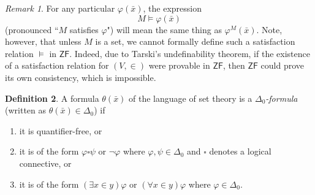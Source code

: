 \documentclass[10pt,letterpaper,cm]{nupset}
\theoremstyle{definition}
\newtheorem{definition}{Definition}[subsection]
\theoremstyle{theorem}
\theoremstyle{remark}
\newtheorem{remark}[definition]{Remark}
\newcommand{\1}{\mathbf{1}}
\newcommand{\0}{\vec 0}
\newcommand{\zf}{\mathsf{ZF}}
\newcommand{\be}{\begin{enumerate}}
\newcommand{\ee}{\end{enumerate}}
\begin{document}
\begin{remark}
For any particular $\varphi(\bar{x})$, the expression $$M \models \varphi(\bar{x})$$ (pronounced ``$M$ satisfies $\varphi$") will mean the same thing as $\varphi^M(\bar{x})$. Note, however, that unless $M$ is a set, we cannot formally define such a satisfaction relation $\models$ in $\zf$. Indeed, due to Tarski's undefinability theorem, if the existence of a satisfaction relation for $(V,\in)$ were provable in $\zf$, then $\zf$ could prove its own consistency, which is impossible. 
\end{remark}

\begin{definition}
A formula $\theta(\bar{x})$ of the language of set theory is a \textit{$\Delta_0$-formula} (written as $\theta(\bar{x}) \in \Delta_0$) if
\be[label=(\alph*)]
\item it is quantifier-free, or
\item it is of the form $\varphi \square \psi$ or $\neg{\varphi}$ where $\varphi, \psi \in \Delta_0$ and $\square$ denotes a logical connective, or
\item it is of the form $(\exists x \in y)\varphi$ or $(\forall x \in y)\varphi$ where $\varphi \in \Delta_0$.
\ee
\end{definition}
\end{document}
